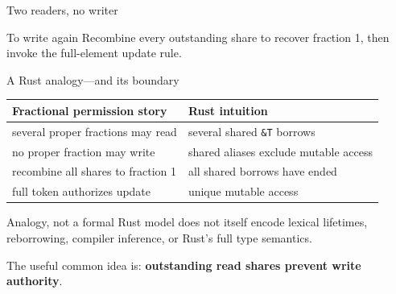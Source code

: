 \documentclass[aspectratio=169,10pt]{beamer}
\newcommand{\ptfull}[2]{#1\mathrel{\mapsto_{\gamma_m}}#2}
\newcommand{\ptfrac}[3]{#1\mathrel{\mapsto_{\gamma_m}^{#2}}#3}
\newcommand{\code}[1]{\texttt{\detokenize{#1}}}
\newcommand{\good}[1]{\textcolor{CrisGreen}{#1}}
\newcommand{\warn}[1]{\textcolor{CrisRed}{#1}}
\newcommand{\keypoint}[1]{\textcolor{CrisBlue}{\bfseries #1}}
\begin{document}
\begin{frame}{Two readers, no writer}
  \begin{center}
  \end{center}

  \vspace{0.3cm}
  \begin{block}{To write again}
    Recombine every outstanding share to recover fraction 1, then invoke the full-element update rule.
  \end{block}
\end{frame}

\begin{frame}{A Rust analogy---and its boundary}
  \renewcommand{\arraystretch}{1.35}
  \begin{tabularx}{\textwidth}{X X}
    \toprule
    \textbf{Fractional permission story} & \textbf{Rust intuition} \\
    \midrule
    several proper fractions may read & several shared \texttt{\&T} borrows \\
    no proper fraction may write & shared aliases exclude mutable access \\
    recombine all shares to fraction 1 & all shared borrows have ended \\
    full token authorizes update & unique mutable access \\
    \bottomrule
  \end{tabularx}

  \vspace{0.7cm}
  \begin{alertblock}{Analogy, not a formal Rust model}
    \code{ghost_map} does not itself encode lexical lifetimes, reborrowing, compiler inference, or Rust's full type semantics.
  \end{alertblock}

  \begin{center}
    The useful common idea is: \keypoint{outstanding read shares prevent write authority}.
  \end{center}
\end{frame}
\end{document}
